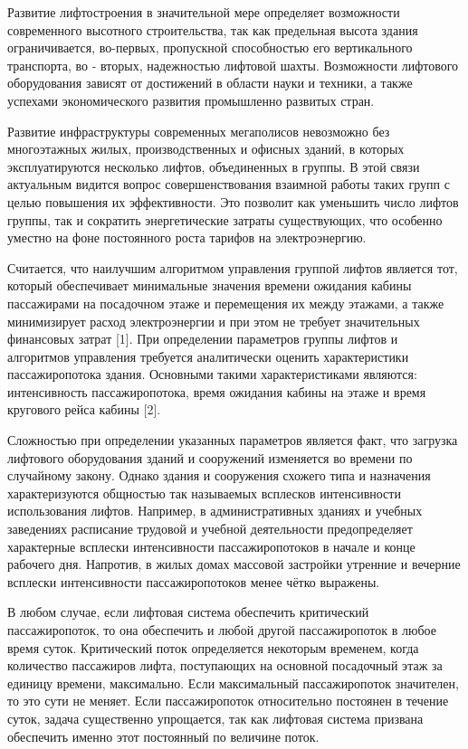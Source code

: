 	Развитие лифтостроения в значительной мере определяет возможности современного высотного строительства,
		так как предельная высота здания ограничивается, во-первых, пропускной способностью его вертикального транспорта,
		во - вторых, надежностью лифтовой шахты. Возможности лифтового оборудования зависят от достижений в области
		науки и техники, а также успехами экономического развития промышленно развитых стран.

	Развитие инфраструктуры современных мегаполисов невозможно без многоэтажных жилых, производственных и офисных зданий,
		в которых эксплуатируются несколько лифтов, объединенных в группы. В этой связи актуальным видится вопрос
		совершенствования взаимной работы таких групп с целью повышения их эффективности.
		Это позволит как уменьшить число лифтов группы, так и сократить энергетические затраты существующих,
		что особенно уместно на фоне постоянного роста тарифов на электроэнергию.

	Считается, что наилучшим алгоритмом управления группой лифтов является тот, который обеспечивает минимальные значения
		времени ожидания кабины пассажирами на посадочном этаже и перемещения их между этажами, а также минимизирует расход
		электроэнергии и при этом не требует значительных финансовых затрат [1].
		При определении параметров группы лифтов и алгоритмов управления требуется аналитически оценить характеристики
		пассажиропотока здания.
		Основными такими характеристиками являются: интенсивность пассажиропотока, время ожидания кабины на этаже и время
		кругового рейса кабины [2].
		
	Сложностью при определении указанных параметров является факт, что загрузка лифтового
		оборудования зданий и сооружений изменяется во времени по случайному закону. Однако здания и сооружения схожего типа
		и назначения характеризуются общностью так называемых всплесков интенсивности использования лифтов.
		Например, в административных зданиях и учебных заведениях расписание трудовой и учебной деятельности предопределяет
		характерные всплески интенсивности пассажиропотоков в начале и конце рабочего дня.
		Напротив, в жилых домах массовой застройки утренние и вечерние всплески интенсивности пассажиропотоков
		менее чётко выражены.

	В любом случае, если лифтовая система обеспечить критический пассажиропоток, то она обеспечить и любой другой пассажиропоток
		в любое время суток. Критический поток определяется некоторым временем, когда количество пассажиров лифта, поступающих на
		основной посадочный этаж за единицу времени, максимально. Если максимальный пассажиропоток значителен, то это сути не меняет.
		Если пассажиропоток относительно постоянен в течение суток, задача существенно упрощается, так как лифтовая система
		призвана обеспечить именно этот постоянный по величине поток.

